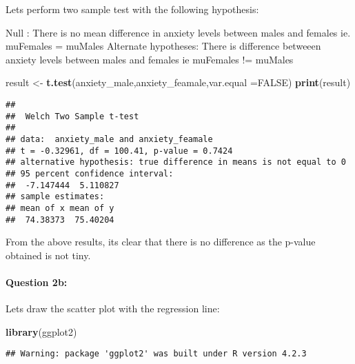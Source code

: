 \documentclass[
]{article}
\newenvironment{Shaded}{\begin{snugshade}}{\end{snugshade}}
\newcommand{\AttributeTok}[1]{\textcolor[rgb]{0.13,0.29,0.53}{#1}}
\newcommand{\ConstantTok}[1]{\textcolor[rgb]{0.56,0.35,0.01}{#1}}
\newcommand{\FunctionTok}[1]{\textcolor[rgb]{0.13,0.29,0.53}{\textbf{#1}}}
\newcommand{\NormalTok}[1]{#1}
\newcommand{\OtherTok}[1]{\textcolor[rgb]{0.56,0.35,0.01}{#1}}
\begin{document}
Lets perform two sample test with the following hypothesis:

Null : There is no mean difference in anxiety levels between males and
females ie. muFemales = muMales Alternate hypotheses: There is
difference betweeen anxiety levels between males and females ie
muFemales != muMales

\begin{Shaded}
\begin{Highlighting}[]
\NormalTok{result }\OtherTok{\textless{}{-}} \FunctionTok{t.test}\NormalTok{(anxiety\_male,anxiety\_feamale,}\AttributeTok{var.equal =}\ConstantTok{FALSE}\NormalTok{)}
\FunctionTok{print}\NormalTok{(result)}
\end{Highlighting}
\end{Shaded}

\begin{verbatim}
## 
##  Welch Two Sample t-test
## 
## data:  anxiety_male and anxiety_feamale
## t = -0.32961, df = 100.41, p-value = 0.7424
## alternative hypothesis: true difference in means is not equal to 0
## 95 percent confidence interval:
##  -7.147444  5.110827
## sample estimates:
## mean of x mean of y 
##  74.38373  75.40204
\end{verbatim}

From the above results, its clear that there is no difference as the
p-value obtained is not tiny.

\hypertarget{question-2b}{%
\paragraph{Question 2b:}\label{question-2b}}

Lets draw the scatter plot with the regression line:

\begin{Shaded}
\begin{Highlighting}[]
\FunctionTok{library}\NormalTok{(ggplot2)}
\end{Highlighting}
\end{Shaded}

\begin{verbatim}
## Warning: package 'ggplot2' was built under R version 4.2.3
\end{verbatim}
\end{document}
